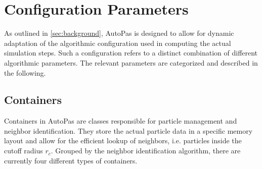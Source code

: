 \section{Configuration Parameters}
\label{sec:config_params}

As outlined in \autoref{sec:background}, AutoPas is designed to allow for dynamic adaptation of the algorithmic configuration used in computing the actual simulation steps. Such a configuration refers to a distinct combination of different algorithmic parameters. The relevant parameters are categorized and described in the following.

\subsection{Containers}

Containers in AutoPas are classes responsible for particle management and neighbor identification. They store the actual particle data in a specific memory layout and allow for the efficient lookup of neighbors, i.e. particles inside the cutoff radius $r_c$. Grouped by the neighbor identification algorithm, there are currently four different types of containers.

